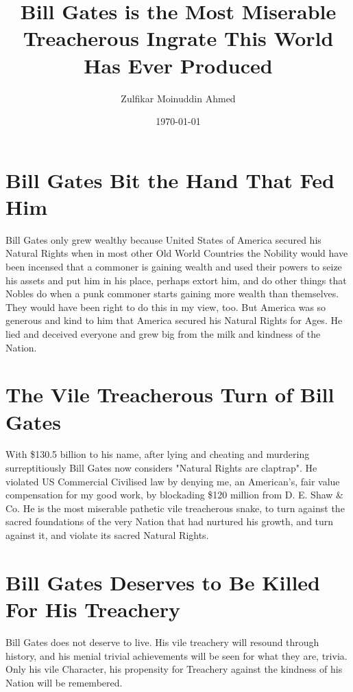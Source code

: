 \documentclass{amsart}
\title{Bill Gates is the Most Miserable Treacherous Ingrate This World Has Ever Produced}
\author{Zulfikar Moinuddin Ahmed}
\date{\today}
\begin{document}
\maketitle

\section{Bill Gates Bit the Hand That Fed 
Him}

Bill Gates only grew wealthy because United States of America secured his Natural Rights when in most other Old World Countries the Nobility would have been incensed that a commoner is gaining wealth and used their powers to seize his assets and put him in his place, perhaps extort him, and do other things that Nobles do when a punk commoner starts gaining more wealth than themselves.  They would have been right to do this in my view, too.  But America was so generous and kind to him that America secured his Natural Rights for Ages.  He lied and deceived everyone and grew big from the milk and kindness of the Nation.  

\section{The Vile Treacherous Turn of Bill Gates}

With \$130.5 billion to his name, after lying and cheating and murdering surreptitiously Bill Gates now considers "Natural Rights are claptrap".  He violated US Commercial Civilised law by denying me, an American's, fair value compensation for my good work, by blockading \$120 million from D. E. Shaw \& Co.  He is the most miserable pathetic vile treacherous snake, to turn against the sacred foundations of the very Nation that had nurtured his growth, and turn against it, and violate its sacred Natural Rights.  

\section{Bill Gates Deserves to Be Killed For His Treachery}

Bill Gates does not deserve to live.  His vile treachery will resound through history, and his menial trivial achievements will be seen for what they are, trivia.  Only his vile Character, his propensity for Treachery against the kindness of his Nation will be remembered.
\end{document}
